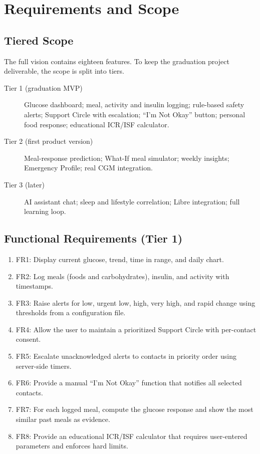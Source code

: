 \chapter{Requirements and Scope}

\section{Tiered Scope}
The full vision contains eighteen features. To keep the graduation project deliverable, the scope is split into tiers.

\begin{description}
  \item[Tier 1 (graduation MVP)] Glucose dashboard; meal, activity and insulin logging; rule-based safety alerts; Support Circle with escalation; ``I'm Not Okay'' button; personal food response; educational ICR/ISF calculator.
  \item[Tier 2 (first product version)] Meal-response prediction; What-If meal simulator; weekly insights; Emergency Profile; real CGM integration.
  \item[Tier 3 (later)] AI assistant chat; sleep and lifestyle correlation; Libre integration; full learning loop.
\end{description}

\section{Functional Requirements (Tier 1)}
\begin{enumerate}
  \item FR1: Display current glucose, trend, time in range, and daily chart.
  \item FR2: Log meals (foods and carbohydrates), insulin, and activity with timestamps.
  \item FR3: Raise alerts for low, urgent low, high, very high, and rapid change using thresholds from a configuration file.
  \item FR4: Allow the user to maintain a prioritized Support Circle with per-contact consent.
  \item FR5: Escalate unacknowledged alerts to contacts in priority order using server-side timers.
  \item FR6: Provide a manual ``I'm Not Okay'' function that notifies all selected contacts.
  \item FR7: For each logged meal, compute the glucose response and show the most similar past meals as evidence.
  \item FR8: Provide an educational ICR/ISF calculator that requires user-entered parameters and enforces hard limits.
\end{enumerate}

